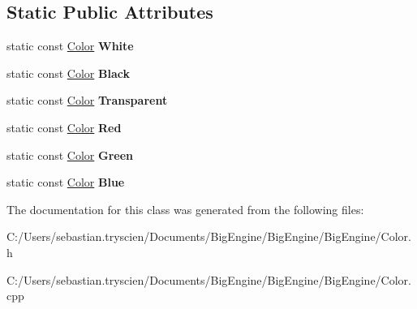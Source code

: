 \subsection*{Static Public Attributes}
\begin{DoxyCompactItemize}
\item 
\mbox{\label{class_big_1_1_color_a62b1b91d377fa2776c84adc9160f3ed1}} 
static const \mbox{\hyperlink{class_big_1_1_color}{Color}} {\bfseries White}
\item 
\mbox{\label{class_big_1_1_color_a9dfa9794cdeac598fb85830e73d7812c}} 
static const \mbox{\hyperlink{class_big_1_1_color}{Color}} {\bfseries Black}
\item 
\mbox{\label{class_big_1_1_color_aa65e159f5c4cc76bdd41655393f70ef3}} 
static const \mbox{\hyperlink{class_big_1_1_color}{Color}} {\bfseries Transparent}
\item 
\mbox{\label{class_big_1_1_color_a2cb65d51137713574ee658fbf74e6261}} 
static const \mbox{\hyperlink{class_big_1_1_color}{Color}} {\bfseries Red}
\item 
\mbox{\label{class_big_1_1_color_adc65fc7bb643e3f2a3e16c7017689c6c}} 
static const \mbox{\hyperlink{class_big_1_1_color}{Color}} {\bfseries Green}
\item 
\mbox{\label{class_big_1_1_color_af6db2c9824b21293e8c0c8a2d581107f}} 
static const \mbox{\hyperlink{class_big_1_1_color}{Color}} {\bfseries Blue}
\end{DoxyCompactItemize}


The documentation for this class was generated from the following files\+:\begin{DoxyCompactItemize}
\item 
C\+:/\+Users/sebastian.\+tryscien/\+Documents/\+Big\+Engine/\+Big\+Engine/\+Big\+Engine/Color.\+h\item 
C\+:/\+Users/sebastian.\+tryscien/\+Documents/\+Big\+Engine/\+Big\+Engine/\+Big\+Engine/Color.\+cpp\end{DoxyCompactItemize}
